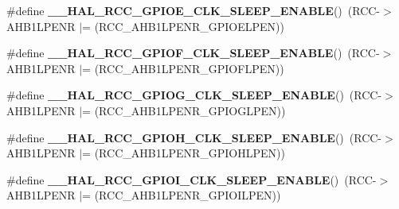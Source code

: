 \begin{DoxyCompactItemize}
\item 
\mbox{\label{group___r_c_c_ex___peripheral___clock___sleep___enable___disable_ga18d20464a11db42973a0cc6df21b0e22}} 
\#define {\bfseries \+\_\+\+\_\+\+H\+A\+L\+\_\+\+R\+C\+C\+\_\+\+G\+P\+I\+O\+E\+\_\+\+C\+L\+K\+\_\+\+S\+L\+E\+E\+P\+\_\+\+E\+N\+A\+B\+LE}()~(R\+CC-\/$>$A\+H\+B1\+L\+P\+E\+NR $\vert$= (R\+C\+C\+\_\+\+A\+H\+B1\+L\+P\+E\+N\+R\+\_\+\+G\+P\+I\+O\+E\+L\+P\+EN))
\item 
\mbox{\label{group___r_c_c_ex___peripheral___clock___sleep___enable___disable_gac520a0043affccd819818a11b19523a2}} 
\#define {\bfseries \+\_\+\+\_\+\+H\+A\+L\+\_\+\+R\+C\+C\+\_\+\+G\+P\+I\+O\+F\+\_\+\+C\+L\+K\+\_\+\+S\+L\+E\+E\+P\+\_\+\+E\+N\+A\+B\+LE}()~(R\+CC-\/$>$A\+H\+B1\+L\+P\+E\+NR $\vert$= (R\+C\+C\+\_\+\+A\+H\+B1\+L\+P\+E\+N\+R\+\_\+\+G\+P\+I\+O\+F\+L\+P\+EN))
\item 
\mbox{\label{group___r_c_c_ex___peripheral___clock___sleep___enable___disable_gab1d4773e76bae0871b8dace747971fc4}} 
\#define {\bfseries \+\_\+\+\_\+\+H\+A\+L\+\_\+\+R\+C\+C\+\_\+\+G\+P\+I\+O\+G\+\_\+\+C\+L\+K\+\_\+\+S\+L\+E\+E\+P\+\_\+\+E\+N\+A\+B\+LE}()~(R\+CC-\/$>$A\+H\+B1\+L\+P\+E\+NR $\vert$= (R\+C\+C\+\_\+\+A\+H\+B1\+L\+P\+E\+N\+R\+\_\+\+G\+P\+I\+O\+G\+L\+P\+EN))
\item 
\mbox{\label{group___r_c_c_ex___peripheral___clock___sleep___enable___disable_ga3e9419b44e83ed1e6951801c390a69ad}} 
\#define {\bfseries \+\_\+\+\_\+\+H\+A\+L\+\_\+\+R\+C\+C\+\_\+\+G\+P\+I\+O\+H\+\_\+\+C\+L\+K\+\_\+\+S\+L\+E\+E\+P\+\_\+\+E\+N\+A\+B\+LE}()~(R\+CC-\/$>$A\+H\+B1\+L\+P\+E\+NR $\vert$= (R\+C\+C\+\_\+\+A\+H\+B1\+L\+P\+E\+N\+R\+\_\+\+G\+P\+I\+O\+H\+L\+P\+EN))
\item 
\mbox{\label{group___r_c_c_ex___peripheral___clock___sleep___enable___disable_ga303d0d577afc9d9c30883f9559e3ad1b}} 
\#define {\bfseries \+\_\+\+\_\+\+H\+A\+L\+\_\+\+R\+C\+C\+\_\+\+G\+P\+I\+O\+I\+\_\+\+C\+L\+K\+\_\+\+S\+L\+E\+E\+P\+\_\+\+E\+N\+A\+B\+LE}()~(R\+CC-\/$>$A\+H\+B1\+L\+P\+E\+NR $\vert$= (R\+C\+C\+\_\+\+A\+H\+B1\+L\+P\+E\+N\+R\+\_\+\+G\+P\+I\+O\+I\+L\+P\+EN))

\end{DoxyCompactItemize}
